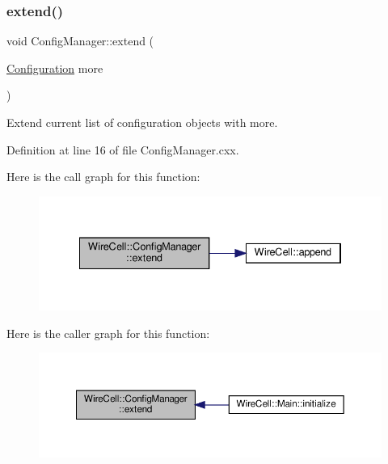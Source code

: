 \subsubsection{\texorpdfstring{extend()}{extend()}}
{\footnotesize\ttfamily void Config\+Manager\+::extend (\begin{DoxyParamCaption}\item[{\hyperlink{namespace_wire_cell_a9f705541fc1d46c608b3d32c182333ee}{Configuration}}]{more }\end{DoxyParamCaption})}



Extend current list of configuration objects with more. 



Definition at line 16 of file Config\+Manager.\+cxx.

Here is the call graph for this function\+:
\nopagebreak
\begin{figure}[H]
\begin{center}
\leavevmode
\includegraphics[width=334pt]{class_wire_cell_1_1_config_manager_abd465f55ebf6135f5e24b5074020fa36_cgraph}
\end{center}
\end{figure}
Here is the caller graph for this function\+:
\nopagebreak
\begin{figure}[H]
\begin{center}
\leavevmode
\includegraphics[width=350pt]{class_wire_cell_1_1_config_manager_abd465f55ebf6135f5e24b5074020fa36_icgraph}
\end{center}
\end{figure}
\mbox{\label{class_wire_cell_1_1_config_manager_aca683be02b131cdab4a1a54aeb635206}} 
